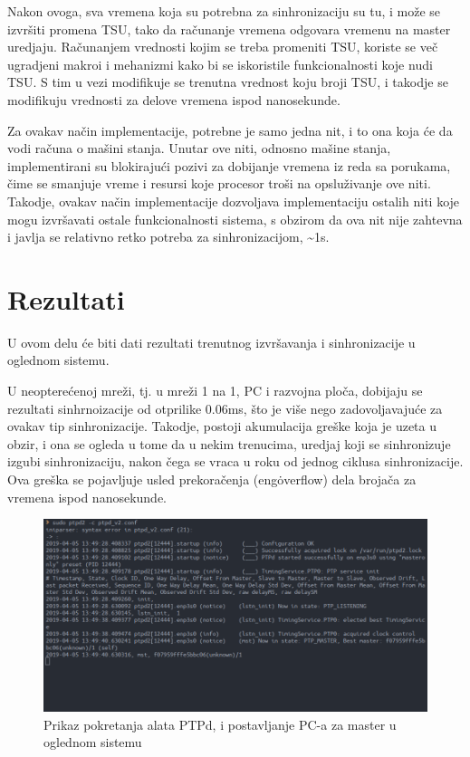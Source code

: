 \documentclass[a4paper,12pt, master]{etf}
\begin{document}
	Nakon ovoga, sva vremena koja su potrebna za sinhronizaciju su tu, i
	mo\v{z}e se izvr\v{s}iti promena TSU, tako da ra\v{c}unanje vremena
	odgovara vremenu na master uredjaju. Ra\v{c}unanjem vrednosti kojim se
	treba promeniti TSU, koriste se ve\v{c} ugradjeni makroi i mehanizmi kako
	bi se iskoristile funkcionalnosti koje nudi TSU\@. S tim u vezi modifikuje
	se trenutna vrednost koju broji TSU, i takodje se modifikuju vrednosti za
	delove vremena ispod nanosekunde.

	Za ovakav na\v{c}in implementacije, potrebne je samo jedna nit, i to ona
	koja \'{c}e da vodi ra\v{c}una o ma\v{s}ini stanja. Unutar ove niti,
	odnosno ma\v{s}ine stanja, implementirani su blokiraju\'{c}i pozivi za
	dobijanje vremena iz reda sa porukama, \v{c}ime se smanjuje vreme i resursi
	koje procesor tro\v{s}i na opslu\v{z}ivanje ove niti. Takodje, ovakav
	na\v{c}in implementacije dozvoljava implementaciju ostalih niti koje mogu
	izvr\v{s}avati ostale funkcionalnosti sistema, s obzirom da ova nit nije
	zahtevna i javlja se relativno retko potreba za sinhronizacijom,
    \textasciitilde 1s.

	\section{Rezultati}

	U ovom delu \'{c}e biti dati rezultati trenutnog izvr\v{s}avanja i
	sinhronizacije u oglednom sistemu.

	U neoptere\'{c}enoj mre\v{z}i, tj\@. u mre\v{z}i 1 na 1, PC i razvojna
	plo\v{c}a, dobijaju se rezultati sinhrnoizacije od otprilike 0.06ms,
	\v{s}to je vi\v{s}e nego zadovoljavaju\'{c}e za ovakav tip sinhronizacije.
	Takodje, postoji akumulacija gre\v{s}ke koja je uzeta u obzir, i ona se
	ogleda u tome da u nekim trenucima, uredjaj koji se	sinhronizuje izgubi
	sinhronizaciju, nakon \v{c}ega se vraca u roku od jednog ciklusa
	sinhronizacije. Ova gre\v{s}ka se pojavljuje usled prekora\v{c}enja
	(eng\. overflow) dela broja\v{c}a za vremena ispod nanosekunde.

	\begin{figure}[htb]
			\centering
			\includegraphics[scale=1.0]{../pic/ptpd_startup.png}
            \caption{Prikaz pokretanja alata PTPd, i postavljanje PC-a za
            master u oglednom sistemu}
			\label{fig:ptpd_startup}
	\end{figure}
\end{document}
